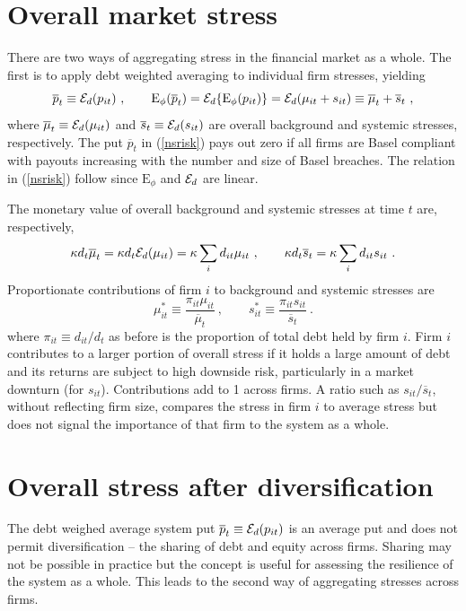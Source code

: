 \documentclass[12pt]{article}
\newcommand{\E}{\mathrm{E}}
\newcommand{\Ex}{{\cal E}}
\newcommand{\Exd}{\Ex_d}
\newcommand{\Es}{\E_\phi}
\newcommand{\eref}[1]{(\ref{#1})}
\newcommand{\cq}{\ , \qquad}
\newcommand{\be}[1]{\begin{equation}\label{#1}}
\newcommand{\ee}{\end{equation}}
\begin{document}
\section{Overall market stress}\label{aggregate}


There are two ways of aggregating stress in the financial market as a whole.  The first is to apply debt weighted averaging to individual firm stresses, yielding
\be{nsrisk}
\overline p_t \equiv \Exd(p_{it}) \cq \Es(\overline p_t)=\Exd\{\Es(p_{it})\} = \Exd(\mu_{it}+s_{it}) \equiv \overline\mu_{t}+\overline s_t \ ,
\ee
where $\overline\mu_{t}\equiv\Exd(\mu_{it})$ and $\overline s_{t}\equiv\Exd(s_{it})$ are overall background and systemic stresses, respectively. The put $\overline p_t$ in \eref{nsrisk} pays out zero if all firms are Basel compliant with payouts increasing with the number and size of Basel breaches. The relation in \eref{nsrisk} follow since  $\Es$ and $\Exd$ are linear.

The monetary value of overall background and systemic stresses at time $t$ are, respectively,
$$
\kappa d_t\overline\mu_t = \kappa d_t\Exd(\mu_{it}) = \kappa\sum_i d_{it}\mu_{it}\cq \kappa d_t\overline s_t  = \kappa\sum_i d_{it}s_{it}\ .
$$
Proportionate contributions of firm $i$ to background and systemic stresses are
\be{standardised}
\mu_{it}^*\equiv \frac{\pi_{it}\mu_{it}}{\overline \mu_t} \cq s_{it}^*\equiv\frac{\pi_{it}s_{it}}{\overline s_t}\ .
\ee
where $\pi_{it}\equiv d_{it}/d_t$ as before is the proportion of total debt held by firm $i$. Firm $i$ contributes to a larger portion of overall stress if it holds a large amount of debt and its returns are subject to high downside risk, particularly in a market downturn (for $s_{it}$). Contributions add to 1 across firms.  A ratio such as $s_{it}/\overline s_t$, without reflecting firm size, compares the stress in firm $i$ to average stress but does not signal the importance of that firm to the system as a whole.


\section{Overall stress after diversification}\label{aggregate1}

The debt weighed average system  put $\overline p_t\equiv\Ex_d(p_{it})$ is an average put and does not permit  diversification -- the  sharing of debt and equity across firms.   Sharing may not be possible in practice but the concept is useful for assessing the resilience of the system as a whole.   This leads to the second way of aggregating stresses across firms.
\end{document}
